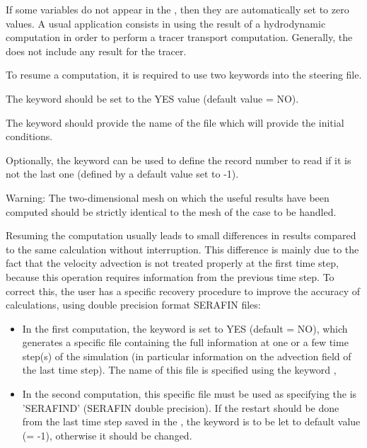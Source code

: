 If some variables do not appear in the , then they are automatically set to zero values.  A usual application
consists in using the result of a hydrodynamic computation in order to perform
a tracer transport computation. Generally, the  does not include any result for the tracer.

To resume a computation, it is required to use two keywords into the steering
file.

The keyword  should be set to the YES value
(default value = NO).

The keyword  should provide the name of the
file which will provide the initial conditions.

Optionally, the keyword  can be used to
define the record number to read if it is not the last one (defined by a
default value set to -1).

\begin{WarningBlock}{Warning:}
The two-dimensional mesh on which the useful results have been computed should
be strictly identical to the mesh of the case to be handled.
\end{WarningBlock}

Resuming the computation usually leads to small differences in results
compared to the same calculation without interruption. This difference is
mainly due to the fact that the velocity advection is not treated properly at
the first time step, because this operation requires information from the
previous time step. To correct this, the user has a specific recovery procedure
to improve the accuracy of calculations, using double precision format SERAFIN
files:

\begin{itemize}
\item In the first computation, the keyword  is set to
YES (default = NO),
which generates a specific file containing the full information at one or a
few time step(s) of the simulation (in particular information on the
advection field of the last time step). The name of this file is specified
using the keyword ,

\item In the second computation, this specific file must be used as
 specifying the  is 'SERAFIND' (SERAFIN double precision).
If the restart should be done from the last time step saved in the
, the keyword  is to be
let to default value (= -1), otherwise it should be changed.
\end{itemize}

